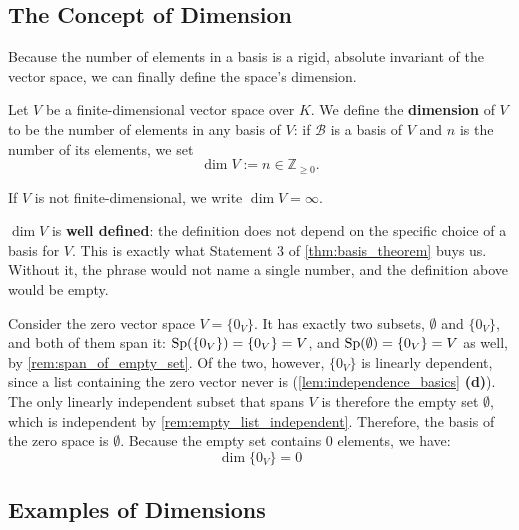 \subsection{The Concept of Dimension}

Because the number of elements in a basis is a rigid, absolute invariant of the vector space, we can finally define the space's dimension.

\begin{definition}[Dimension]
\label{def:dimension}
Let $V$ be a finite-dimensional vector space over $K$. We define the \textbf{dimension} of $V$ to be the number of elements in any basis of $V$: if $\mathcal{B}$ is a basis of $V$ and $n$ is the number of its elements, we set
\[
\dim V := n \in \mathbb{Z}_{\ge 0}.
\]

If $V$ is not finite-dimensional, we write $\dim V = \infty$.
\end{definition}

\begin{importantremark}
\label{rem:dimension_well_defined}
$\dim V$ is \textbf{well defined}: the definition does not depend on the specific choice of a basis for $V$. This is exactly what Statement 3 of \cref{thm:basis_theorem} buys us. Without it, the phrase  would not name a single number, and the definition above would be empty.
\end{importantremark}

\begin{remark}
\label{rem:dimension_of_zero_space}
Consider the zero vector space $V = \{0_V\}$. It has exactly two subsets, $\emptyset$ and $\{0_V\}$, and both of them span it: $\operatorname{Sp}(\{0_V\}) = \{0_V\} = V$, and $\operatorname{Sp}(\emptyset) = \{0_V\} = V$ as well, by \cref{rem:span_of_empty_set}. Of the two, however, $\{0_V\}$ is linearly dependent, since a list containing the zero vector never is (\cref{lem:independence_basics} \textbf{(d)}). The only linearly independent subset that spans $V$ is therefore the empty set $\emptyset$, which is independent by \cref{rem:empty_list_independent}.
Therefore, the basis of the zero space is $\emptyset$. Because the empty set contains $0$ elements, we have:
\[
\dim \{0_V\} = 0
\]
\end{remark}

\subsection{Examples of Dimensions}


